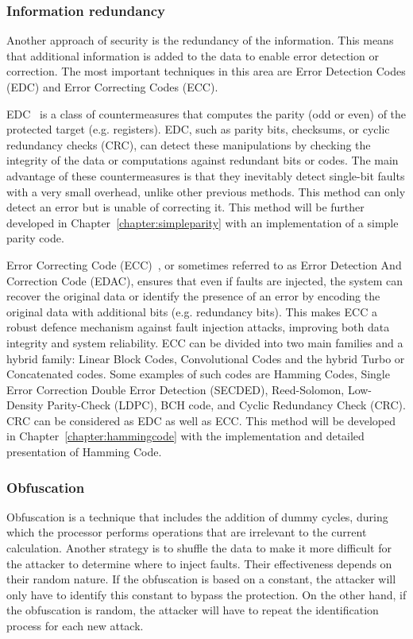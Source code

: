 \subsubsection{Information redundancy}
Another approach of security is the redundancy of the information. This means that additional information is added to the data to enable error detection or correction. The most important techniques in this area are Error Detection Codes (EDC) and Error Correcting Codes (ECC).

EDC~\cite{APHBML-16-date,MKBM-14-sta,BBKMP-03-toc} is a class of countermeasures that computes the parity (odd or even) of the protected target (e.g. registers). EDC, such as parity bits, checksums, or cyclic redundancy checks (CRC), can detect these manipulations by checking the integrity of the data or computations against redundant bits or codes. The main advantage of these countermeasures is that they inevitably detect single-bit faults with a very small overhead, unlike other previous methods. This method can only detect an error but is unable of correcting it. This method will be further developed in Chapter~\ref{chapter:simpleparity} with an implementation of a simple parity code.

Error Correcting Code (ECC)~\cite{PTCVAJ-20-iscas,DGMMNM-20-arcs,CB-06-toc}, or sometimes referred to as Error Detection And Correction Code (EDAC), ensures that even if faults are injected, the system can recover the original data or identify the presence of an error by encoding the original data with additional bits (e.g. redundancy bits). This makes ECC a robust defence mechanism against fault injection attacks, improving both data integrity and system reliability. ECC can be divided into two main families and a hybrid family: Linear Block Codes, Convolutional Codes and the hybrid Turbo or Concatenated codes. Some examples of such codes are Hamming Codes, Single Error Correction Double Error Detection (SECDED), Reed-Solomon, Low-Density Parity-Check (LDPC), BCH code, and Cyclic Redundancy Check (CRC). CRC can be considered as EDC as well as ECC. This method will be developed in Chapter~\ref{chapter:hammingcode} with the implementation and detailed presentation of Hamming Code.

\subsubsection{Obfuscation}
Obfuscation is a technique that includes the addition of dummy cycles, during which the processor performs operations that are irrelevant to the current calculation. Another strategy is to shuffle the data to make it more difficult for the attacker to determine where to inject faults. Their effectiveness depends on their random nature. If the obfuscation is based on a constant, the attacker will only have to identify this constant to bypass the protection. On the other hand, if the obfuscation is random, the attacker will have to repeat the identification process for each new attack.

